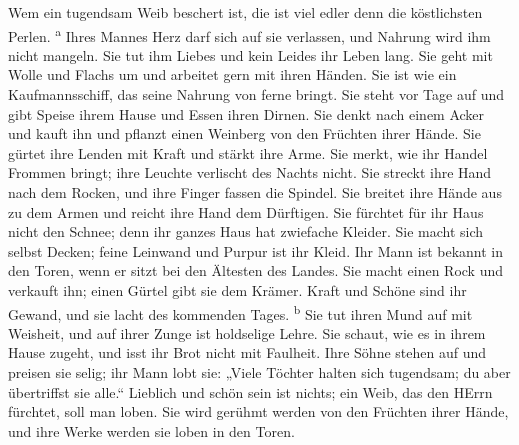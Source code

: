  Wem ein tugendsam Weib beschert ist, die ist viel edler
denn die köstlichsten Perlen. \textsuperscript{a}  Ihres
Mannes Herz darf sich auf sie verlassen, und Nahrung wird ihm nicht
mangeln.  Sie tut ihm Liebes und kein Leides ihr Leben
lang.  Sie geht mit Wolle und Flachs um und arbeitet gern
mit ihren Händen.  Sie ist wie ein Kaufmannsschiff, das
seine Nahrung von ferne bringt.  Sie steht vor Tage auf
und gibt Speise ihrem Hause und Essen ihren Dirnen.  Sie
denkt nach einem Acker und kauft ihn und pflanzt einen Weinberg von den
Früchten ihrer Hände.  Sie gürtet ihre Lenden mit Kraft
und stärkt ihre Arme.  Sie merkt, wie ihr Handel Frommen
bringt; ihre Leuchte verlischt des Nachts nicht.  Sie
streckt ihre Hand nach dem Rocken, und ihre Finger fassen die Spindel.
 Sie breitet ihre Hände aus zu dem Armen und reicht ihre
Hand dem Dürftigen.  Sie fürchtet für ihr Haus nicht den
Schnee; denn ihr ganzes Haus hat zwiefache Kleider.  Sie
macht sich selbst Decken; feine Leinwand und Purpur ist ihr Kleid.
 Ihr Mann ist bekannt in den Toren, wenn er sitzt bei den
Ältesten des Landes.  Sie macht einen Rock und verkauft
ihn; einen Gürtel gibt sie dem Krämer.  Kraft und Schöne
sind ihr Gewand, und sie lacht des kommenden Tages. \textsuperscript{b}
 Sie tut ihren Mund auf mit Weisheit, und auf ihrer Zunge
ist holdselige Lehre.  Sie schaut, wie es in ihrem Hause
zugeht, und isst ihr Brot nicht mit Faulheit.  Ihre Söhne
stehen auf und preisen sie selig; ihr Mann lobt sie: 
„Viele Töchter halten sich tugendsam; du aber übertriffst sie alle.``
 Lieblich und schön sein ist nichts; ein Weib, das den
HErrn fürchtet, soll man loben.  Sie wird gerühmt werden
von den Früchten ihrer Hände, und ihre Werke werden sie loben in den
Toren.
